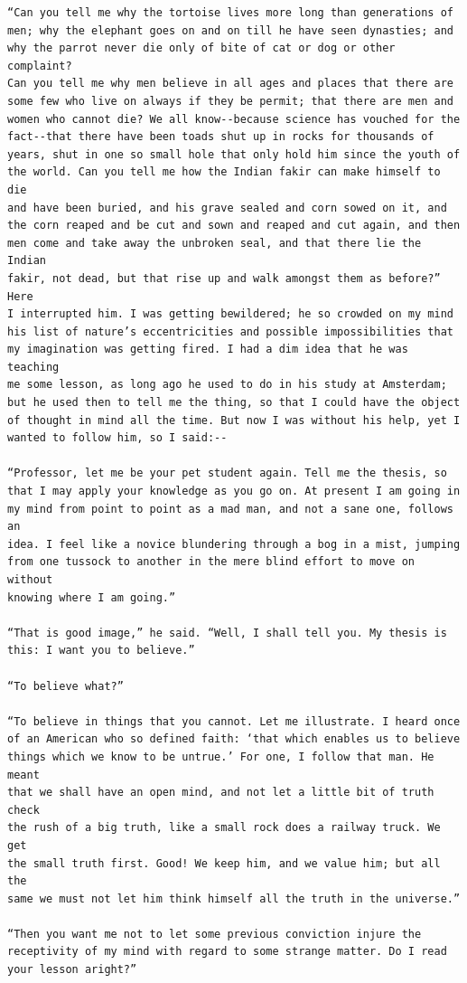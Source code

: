 \documentclass{article}
\begin{document}
\begin{verbatim}
“Can you tell me why the tortoise lives more long than generations of
men; why the elephant goes on and on till he have seen dynasties; and
why the parrot never die only of bite of cat or dog or other complaint?
Can you tell me why men believe in all ages and places that there are
some few who live on always if they be permit; that there are men and
women who cannot die? We all know--because science has vouched for the
fact--that there have been toads shut up in rocks for thousands of
years, shut in one so small hole that only hold him since the youth of
the world. Can you tell me how the Indian fakir can make himself to die
and have been buried, and his grave sealed and corn sowed on it, and
the corn reaped and be cut and sown and reaped and cut again, and then
men come and take away the unbroken seal, and that there lie the Indian
fakir, not dead, but that rise up and walk amongst them as before?” Here
I interrupted him. I was getting bewildered; he so crowded on my mind
his list of nature’s eccentricities and possible impossibilities that
my imagination was getting fired. I had a dim idea that he was teaching
me some lesson, as long ago he used to do in his study at Amsterdam;
but he used then to tell me the thing, so that I could have the object
of thought in mind all the time. But now I was without his help, yet I
wanted to follow him, so I said:--

“Professor, let me be your pet student again. Tell me the thesis, so
that I may apply your knowledge as you go on. At present I am going in
my mind from point to point as a mad man, and not a sane one, follows an
idea. I feel like a novice blundering through a bog in a mist, jumping
from one tussock to another in the mere blind effort to move on without
knowing where I am going.”

“That is good image,” he said. “Well, I shall tell you. My thesis is
this: I want you to believe.”

“To believe what?”

“To believe in things that you cannot. Let me illustrate. I heard once
of an American who so defined faith: ‘that which enables us to believe
things which we know to be untrue.’ For one, I follow that man. He meant
that we shall have an open mind, and not let a little bit of truth check
the rush of a big truth, like a small rock does a railway truck. We get
the small truth first. Good! We keep him, and we value him; but all the
same we must not let him think himself all the truth in the universe.”

“Then you want me not to let some previous conviction injure the
receptivity of my mind with regard to some strange matter. Do I read
your lesson aright?”


\end{verbatim}
\end{document}
